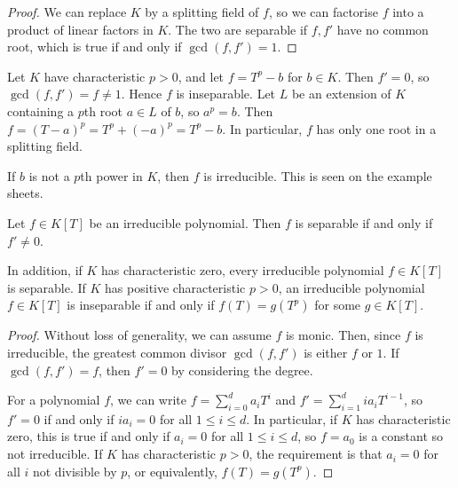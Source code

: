 \begin{proof}
	We can replace \( K \) by a splitting field of \( f \), so we can factorise \( f \) into a product of linear factors in \( K \).
	The two are separable if \( f, f' \) have no common root, which is true if and only if \( \gcd(f, f') = 1 \).
\end{proof}
\begin{example}
	Let \( K \) have characteristic \( p > 0 \), and let \( f = T^p - b \) for \( b \in K \).
	Then \( f' = 0 \), so \( \gcd(f, f') = f \neq 1 \).
	Hence \( f \) is inseparable.
	Let \( L \) be an extension of \( K \) containing a \( p \)th root \( a \in L \) of \( b \), so \( a^p = b \).
	Then \( f = (T - a)^p = T^p + (-a)^p = T^p - b \).
	In particular, \( f \) has only one root in a splitting field.

	If \( b \) is not a \( p \)th power in \( K \), then \( f \) is irreducible.
	This is seen on the example sheets.
\end{example}
\begin{theorem}
	Let \( f \in K[T] \) be an irreducible polynomial.
	Then \( f \) is separable if and only if \( f' \neq 0 \).
	
	In addition, if \( K \) has characteristic zero, every irreducible polynomial \( f \in K[T] \) is separable.
	If \( K \) has positive characteristic \( p > 0 \), an irreducible polynomial \( f \in K[T] \) is inseparable if and only if \( f(T) = g(T^p) \) for some \( g \in K[T] \).
\end{theorem}
\begin{proof}
	Without loss of generality, we can assume \( f \) is monic.
	Then, since \( f \) is irreducible, the greatest common divisor \( \gcd(f,f') \) is either \( f \) or \( 1 \).
	If \( \gcd(f,f') = f \), then \( f' = 0 \) by considering the degree.

	For a polynomial \( f \), we can write \( f = \sum_{i=0}^d a_i T^i \) and \( f' = \sum_{i=1}^d i a_i T^{i-1} \), so \( f' = 0 \) if and only if \( i a_i = 0 \) for all \( 1 \leq i \leq d \).
	In particular, if \( K \) has characteristic zero, this is true if and only if \( a_i = 0 \) for all \( 1 \leq i \leq d \), so \( f = a_0 \) is a constant so not irreducible.
	If \( K \) has characteristic \( p > 0 \), the requirement is that \( a_i = 0 \) for all \( i \) not divisible by \( p \), or equivalently, \( f(T) = g(T^p) \).
\end{proof}

